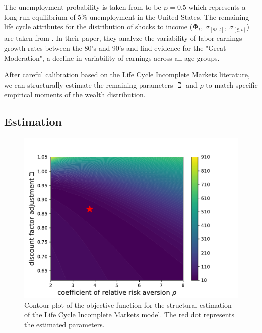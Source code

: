 \documentclass{article}
\newcommand{\CRRA}{\rho}
\newcommand{\PermGroFac}{\pmb{\Phi}}
\newcommand{\PermShk}{\mathbf{\Psi}}
\newcommand{\pZero}{\wp}
\begin{document}
The unemployment probability is taken from \cite{Carroll_1992} to be $\pZero = 0.5$ which represents a long run equilibrium of 5\% unemployment in the United States. The remaining life cycle attributes for the distribution of shocks to income ($\PermGroFac_{t}, \ \sigma_{[\PermShk, t]}, \ \sigma_{[\xi, t]}$) are taken from \cite{Sabelhaus_2010}. In their paper, they analyze the variability of labor earnings growth rates between the 80's and 90's and find evidence for the "Great Moderation", a decline in variability of earnings across all age groups.

After careful calibration based on the Life Cycle Incomplete Markets literature, we can structurally estimate the remaining parameters $\beth$ and $\CRRA$ to match specific empirical moments of the wealth distribution.

\subsection{Estimation}\label{Estimation}

\begin{figure}[!htbp]
\centering
\includegraphics[width=0.7\linewidth]{files/IndShockSMMcontour-5bc9bdda8e84d0a122a59cf513a35efa.pdf}
\caption{Contour plot of the objective function for the structural estimation of the Life Cycle Incomplete Markets model. The red dot represents the estimated parameters.}
\label{fig:IndShockSMMcontour}
\end{figure}
\end{document}
